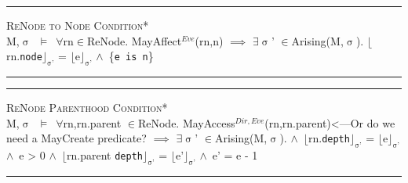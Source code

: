 \documentclass[a4paper,11pt, twoside,twocolumn]{article}
\newenvironment{logic}[1][]
{\begin{flushleft} \small }
{\end{flushleft}}
\newcommand{\loin}{$\in$}
\newcommand{\loforall}{$\forall$}
\newcommand{\loexists}{$\exists$}
\newcommand{\loand}{$\land$}
\newcommand{\loimplies}{$\implies$}
\newcommand{\losigma}{$\upsigma$}
\newcommand{\loturns} {$\vDash$}
\newcommand{\loexec}[2] {$\lfloor$#1$\rfloor _{\text{#2}}$}
\newcommand{\ablock} {\null\qquad}
\begin{document}
{\begin{logic} 
\hrule\null
\textsc{\normalsize *ReNode to Node Condition*}\\
M,\losigma\ \loturns\ \loforall rn\loin ReNode. MayAffect$^{Eve}$(rn,n)\linebreak
\ablock \loimplies \linebreak
\ablock \loexists \losigma' \loin Arising(M,\losigma).\linebreak
\ablock \ablock \loexec{rn.\texttt{node}}{\losigma'} = \loexec{e}{\losigma'} \loand\ \{\texttt{e is n}\}\linebreak
\hrule
\end{logic}

\begin{logic} 
\hrule\null
\textsc{\normalsize *ReNode Parenthood Condition*}\\
M,\losigma\ \loturns\ \loforall rn,rn.parent \loin ReNode. MayAccess$^{Dir,Eve}$(rn,rn.parent)<---Or do we need a MayCreate predicate?\linebreak
\ablock \loimplies \linebreak
\ablock \loexists \losigma' \loin Arising(M,\losigma).\linebreak
\ablock \loand\ \loexec{rn.\texttt{depth}}{\losigma'} = \loexec{e}{\losigma'} \loand\ e > 0\linebreak
\ablock \loand\ \loexec{rn.parent \texttt{depth}}{\losigma'} = \loexec{e'}{\losigma'} \loand\ e' = e - 1\linebreak
\hrule
\end{logic}


\small



\end{document}
